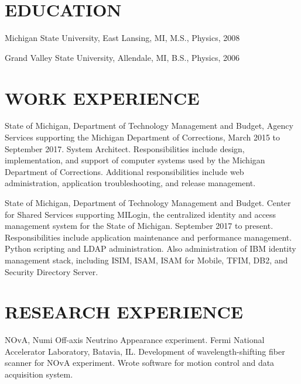 \documentclass{res}
\begin{document}
 
\thispagestyle{empty} %
\address{5227 Witherspoon Way\\
Holt, MI 48842\\
(517) 242 - 3267\\
pagebrian3@gmail.com}


\begin{resume}
\vspace{0.1in}

\section{EDUCATION}
\vspace{0.1in}  
    
    Michigan State University, East Lansing, MI, M.S., Physics, 2008 
 
    Grand Valley State University, Allendale, MI, B.S., Physics, 2006 
 
\section{WORK EXPERIENCE}
\vspace{0.1in}

State of Michigan, Department of Technology Management and Budget, Agency Services supporting the Michigan Department of Corrections, March 2015 to September 2017.  System Architect.  Responsibilities include design, implementation, and support of computer systems used by the Michigan Department of Corrections.  Additional responsibilities include web administration, application troubleshooting, and release management.

State of Michigan, Department of Technology Management and Budget.  Center for Shared Services supporting MILogin, the centralized identity and access management system for the State of Michigan.  September 2017 to present.  Responsibilities include application maintenance and performance management.  Python scripting and LDAP administration.  Also administration of IBM identity management stack, including ISIM, ISAM, ISAM for Mobile, TFIM, DB2, and Security Directory Server.
	
\section{RESEARCH EXPERIENCE}
	\vspace{0.1in}
	
	NOvA, Numi Off-axis Neutrino Appearance experiment.  Fermi National Accelerator Laboratory, Batavia, IL. Development of wavelength-shifting fiber scanner for NOvA experiment.  Wrote software for motion control and data acquisition system.
	

\end{resume}
\end{document}
